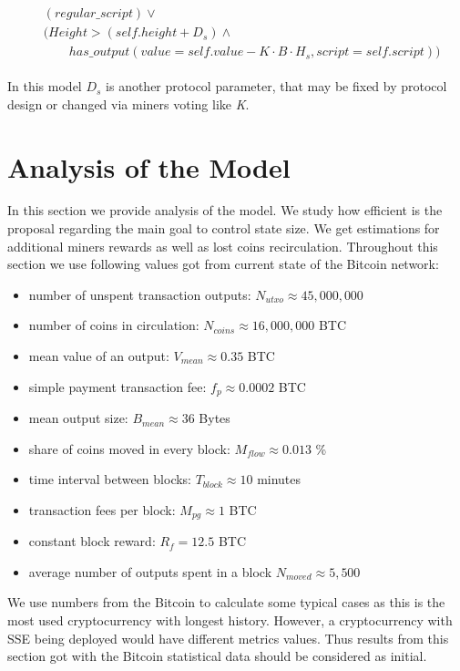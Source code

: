 \documentclass[]{article}   %
\begin{document}
\begin{align}
\begin{split}
&(regular\_script) \lor \\
&(Height > (self.height + D_s) \land \\  
&\qquad has\_output(value = self.value - K \cdot B \cdot H_s, script = self.script))
\end{split}
\end{align}



In this model $D_s$ is another protocol parameter, that may be fixed by protocol design or changed via miners voting like \textit{K}.

\section{Analysis of the Model}
\label{sec:analysis}

In this section we provide analysis of the model. We study how efficient is the proposal regarding the main goal to control state size. We get estimations for additional miners
rewards as well as lost coins recirculation. Throughout this section we use following values got from current state of the Bitcoin network:

\begin{itemize}
  \item number of unspent transaction outputs: $N_{utxo} \approx 45,000,000$
  \item number of coins in circulation: $N_{coins} \approx 16,000,000$ BTC
  \item mean value of an output: $V_{mean} \approx 0.35$ BTC
  \item simple payment transaction fee: $f_{p} \approx 0.0002$ BTC
  \item mean output size: $B_{mean} \approx 36$ Bytes
  \item share of coins moved in every block: $M_{flow} \approx 0.013$ \%
  \item time interval between blocks: $T_{block} \approx 10$ minutes
  \item transaction fees per block: $M_{pg} \approx 1$ BTC
  \item constant block reward: $R_{f} = 12.5$ BTC
  \item average number of outputs spent in a block $N_{moved} \approx 5,500$ 
\end{itemize}

We use numbers from the Bitcoin to calculate some typical cases as this is the most used cryptocurrency with longest history. However, a cryptocurrency with SSE being deployed would have different metrics values. Thus results from this section got with the Bitcoin statistical data should be considered as initial.
\end{document}
